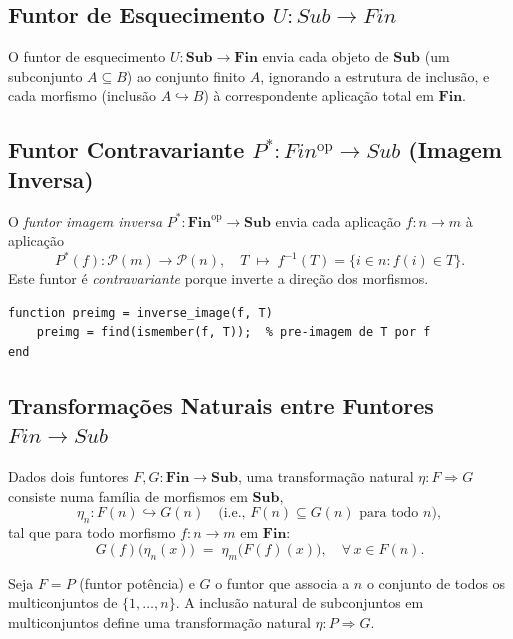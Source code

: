 \subsection{Funtor de Esquecimento \texorpdfstring{$U: Sub \to Fin$}{U: Sub -> Fin}}

O funtor de esquecimento $U: \mathbf{Sub} \to \mathbf{Fin}$ envia cada objeto de $\mathbf{Sub}$ (um subconjunto $A \subseteq B$) ao conjunto finito $A$, ignorando a estrutura de inclusão, e cada morfismo (inclusão $A \hookrightarrow B$) à correspondente aplicação total em $\mathbf{Fin}$.

\subsection{Funtor Contravariante \texorpdfstring{$P^*: Fin^{\mathrm{op}} \to Sub$}{P*: Fin\^op -> Sub} (Imagem Inversa)}

O \emph{funtor imagem inversa} $P^*: \mathbf{Fin}^{\mathrm{op}} \to \mathbf{Sub}$ envia cada aplicação $f: n \to m$ à aplicação
\[
    P^*(f): \mathcal{P}(m) \to \mathcal{P}(n), \quad T \;\longmapsto\; f^{-1}(T) = \{i \in n : f(i) \in T\}.
\]
Este funtor é \emph{contravariante} porque inverte a direção dos morfismos.

\begin{lstlisting}[style=matlab, caption={Funtor contravariante $P^*$ (pré-imagem)}]
function preimg = inverse_image(f, T)
    preimg = find(ismember(f, T));  % pre-imagem de T por f
end
\end{lstlisting}

\subsection{Transformações Naturais entre Funtores \texorpdfstring{$Fin \to Sub$}{Fin -> Sub}}

Dados dois funtores $F, G: \mathbf{Fin} \to \mathbf{Sub}$, uma transformação natural $\eta: F \Rightarrow G$ consiste numa família de morfismos em $\mathbf{Sub}$,
\[
    \eta_n: F(n) \hookrightarrow G(n) \quad \text{(i.e., } F(n) \subseteq G(n) \text{ para todo } n\text{)},
\]
tal que para todo morfismo $f: n \to m$ em $\mathbf{Fin}$:
\[
    G(f)\bigl(\eta_n(x)\bigr) \;=\; \eta_m\bigl(F(f)(x)\bigr), \quad \forall\, x \in F(n).
\]

\begin{remark}
Seja $F = P$ (funtor potência) e $G$ o funtor que associa a $n$ o conjunto de todos os multiconjuntos de $\{1,\ldots,n\}$. A inclusão natural de subconjuntos em multiconjuntos define uma transformação natural $\eta: P \Rightarrow G$.
\end{remark}
